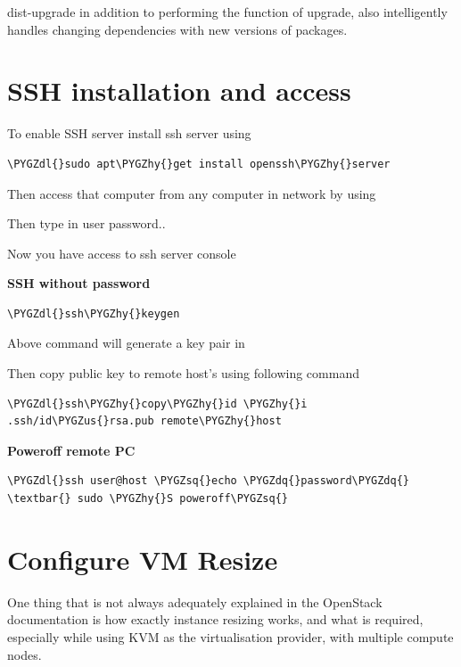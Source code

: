 \documentclass[letterpaper,10pt,english]{sphinxmanual}
\def\PYGZus{\char`\_}
\def\PYGZdl{\char`\$}
\def\PYGZhy{\char`\-}
\def\PYGZsq{\char`\'}
\def\PYGZdq{\char`\"}
\begin{document}
dist-upgrade in addition to performing the function of upgrade, also intelligently handles changing dependencies with new versions of packages.


\section{SSH installation and access}
\label{_source/installation_guide/ssh_config:ssh-installation-and-access}\label{_source/installation_guide/ssh_config::doc}
To enable SSH server install ssh server using

\begin{Verbatim}[commandchars=\\\{\}]
\PYGZdl{}sudo apt\PYGZhy{}get install openssh\PYGZhy{}server
\end{Verbatim}

Then access that computer from any computer in network by using


Then type in user password..

Now you have access to ssh server console

\textbf{SSH without password}

\begin{Verbatim}[commandchars=\\\{\}]
\PYGZdl{}ssh\PYGZhy{}keygen
\end{Verbatim}

Above command will generate a key pair in 

Then copy public key to remote host's  using following command

\begin{Verbatim}[commandchars=\\\{\}]
\PYGZdl{}ssh\PYGZhy{}copy\PYGZhy{}id \PYGZhy{}i .ssh/id\PYGZus{}rsa.pub remote\PYGZhy{}host
\end{Verbatim}

\textbf{Poweroff remote PC}

\begin{Verbatim}[commandchars=\\\{\}]
\PYGZdl{}ssh user@host \PYGZsq{}echo \PYGZdq{}password\PYGZdq{} \textbar{} sudo \PYGZhy{}S poweroff\PYGZsq{}
\end{Verbatim}


\section{Configure VM Resize}
\label{_source/installation_guide/vm_resize:vm-resize}\label{_source/installation_guide/vm_resize::doc}\label{_source/installation_guide/vm_resize:configure-vm-resize}
One thing that is not always adequately explained in the OpenStack documentation is how exactly instance resizing works, and what is required, especially while using KVM as the virtualisation provider, with multiple compute nodes.
\end{document}
